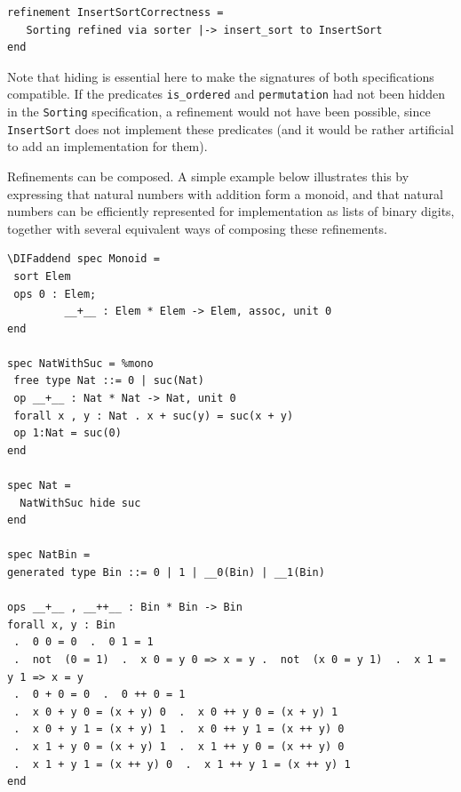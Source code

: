 \documentclass[10pt,fleqn,final]{scrreprt}
\newenvironment{definitions}[0]{\medskip }{}
\providecommand{\DIFaddbegin}{} %
\providecommand{\DIFaddend}{} %
\providecommand{\DIFdelbegin}{} %
\providecommand{\DIFdelend}{} %
\begin{document}
\begin{definitions}
\begin{lstlisting}[basicstyle=\ttfamily\footnotesize,language=dolText,alsolanguage=CASL,escapechar=@,mathescape]
%DIF > % refinement from abstract sorting to insert sort
refinement InsertSortCorrectness =
   Sorting refined via sorter |-> insert_sort to InsertSort
end
\end{lstlisting}
Note that hiding is essential here to make the signatures of
both specifications compatible. If  the
predicates \texttt{is\_ordered} and \texttt{permutation}
had not been hidden in the \texttt{Sorting} specification, a refinement would
not have been possible, since \texttt{InsertSort} does not
implement these predicates (and it would be rather artificial
to add an implementation for them).

\medskip

Refinements can be composed. A simple example below illustrates this
by expressing that natural numbers with addition form a monoid, and
that natural numbers can be efficiently represented for implementation
as lists of binary digits, together with several equivalent ways of
composing these refinements.

\DIFdelbegin %
\DIFdelend \DIFaddbegin \begin{lstlisting}[basicstyle=\ttfamily\footnotesize,language=dolText,alsolanguage=CASL,escapechar=@,mathescape]	
\DIFaddend spec Monoid =
 sort Elem
 ops 0 : Elem;
         __+__ : Elem * Elem -> Elem, assoc, unit 0
end

spec NatWithSuc = %mono
 free type Nat ::= 0 | suc(Nat)
 op __+__ : Nat * Nat -> Nat, unit 0 
 forall x , y : Nat . x + suc(y) = suc(x + y)
 op 1:Nat = suc(0)
end

spec Nat =
  NatWithSuc hide suc
end

spec NatBin =
generated type Bin ::= 0 | 1 | __0(Bin) | __1(Bin)

ops __+__ , __++__ : Bin * Bin -> Bin 
forall x, y : Bin 
 .  0 0 = 0  .  0 1 = 1
 .  not  (0 = 1)  .  x 0 = y 0 => x = y .  not  (x 0 = y 1)  .  x 1 = y 1 => x = y
 .  0 + 0 = 0  .  0 ++ 0 = 1 
 .  x 0 + y 0 = (x + y) 0  .  x 0 ++ y 0 = (x + y) 1
 .  x 0 + y 1 = (x + y) 1  .  x 0 ++ y 1 = (x ++ y) 0 
 .  x 1 + y 0 = (x + y) 1  .  x 1 ++ y 0 = (x ++ y) 0
 .  x 1 + y 1 = (x ++ y) 0  .  x 1 ++ y 1 = (x ++ y) 1 
end


\end{lstlisting}
\end{definitions}
\end{document}

